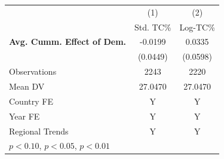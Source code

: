 \begin{tabular}{l*{2}{c}}
\hline
            &\multicolumn{1}{c}{(1)}&\multicolumn{1}{c}{(2)}\\
            &\multicolumn{1}{c}{Std. TC\%}&\multicolumn{1}{c}{Log-TC\%}\\
\hline
\textbf{Avg. Cumm. Effect of Dem.}&     -0.0199         &      0.0335         \\
            &    (0.0449)         &    (0.0598)         \\
\midrule
Observations&        2243         &        2220         \\
Mean DV     &     27.0470         &     27.0470         \\
Country FE  &           Y         &           Y         \\
Year FE     &           Y         &           Y         \\
Regional Trends&           Y         &           Y         \\
\hline
\multicolumn{3}{l}{\footnotesize \sym{*} \(p<0.10\), \sym{**} \(p<0.05\), \sym{***} \(p<0.01\)}\\
\end{tabular}
